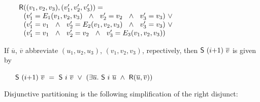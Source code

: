 \documentclass[12pt]{article}
\newcommand{\con}[1]{\mbox{\sf #1}}
\newcommand{\prev}[1]{#1}
\newcommand{\ma}[1]{{{$#1$}}}
\begin{document}
\smallskip

~~~\ma{\begin{array}{l}
{\con{R}}((v_1,v_2,v_3),(v_1',v_2',v_3')) =\\
~~ (v_1' = E_1(v_1,v_2,v_3)  ~~\wedge~~ v_2' = v_2            ~~\wedge~~ v_3' = v_3)~\vee\\
~~ (v_1' = v_1           ~~\wedge~~ v_2' = E_2(v_1,v_2,v_3)   ~~\wedge~~ v_3' = v_3)~\vee\\
~~ (v_1' = v_1           ~~\wedge~~ v_2' = v_2            ~~\wedge~~ v_3' = E_3(v_1,v_2,v_3))
\end{array}}

\smallskip

\noindent If $\overline{u}$, $\overline{v}$ abbreviate $(\prev{u_1},\prev{u_2},\prev{u_3})$,
$(\prev{v_1},\prev{v_2},\prev{v_3})$, repectively, then
${\con{S}~(i{+}1)~}\overline{v}$ is given by

\smallskip

~~~\ma{{\con{S}~(i{+}1)~}\overline{v}~=~
{\con{S}~i~}\overline{v}~\vee~
(\exists \overline{u}.
~{\con{S}~i~}\overline{u}~\wedge~
{{{\con R}(\overline{u},\overline{v}))}}
}

\smallskip

\noindent Disjunctive partitioning is the following simplification of the
right disjunct:

\smallskip
\end{document}
